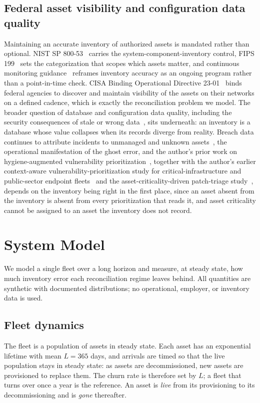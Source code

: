 \documentclass[journal]{IEEEtran}
\begin{document}
\subsection{Federal asset visibility and configuration data quality}
Maintaining an accurate inventory of authorized assets is mandated rather than optional. NIST SP
800-53~\cite{nist80053} carries the system-component-inventory control, FIPS 199~\cite{fips199} sets
the categorization that scopes which assets matter, and continuous monitoring
guidance~\cite{nist80137,nist80137a} reframes inventory accuracy as an ongoing program rather than a
point-in-time check. CISA Binding Operational Directive 23-01~\cite{cisabod2301} binds federal
agencies to discover and maintain visibility of the assets on their networks on a defined cadence,
which is exactly the reconciliation problem we model. The broader question of database and
configuration data quality, including the security consequences of stale or wrong
data~\cite{bertino2005database}, sits underneath: an inventory is a database whose value collapses
when its records diverge from reality. Breach data continues to attribute incidents to unmanaged and
unknown assets~\cite{verizon2026dbir}, the operational manifestation of the ghost error, and the
author's prior work on hygiene-augmented vulnerability
prioritization~\cite{paper4hygieneprio}, together with the author's earlier context-aware
vulnerability-prioritization study for critical-infrastructure and public-sector endpoint
fleets~\cite{paper11capg} and the asset-criticality-driven patch-triage
study~\cite{paper14patch}, depends on the inventory being
right in the first place, since an asset absent from the inventory is absent from every
prioritization that reads it, and asset criticality cannot be assigned to an asset the inventory
does not record.

\section{System Model}
We model a single fleet over a long horizon and measure, at steady state, how much inventory error
each reconciliation regime leaves behind. All quantities are synthetic with documented
distributions; no operational, employer, or inventory data is used.

\subsection{Fleet dynamics}
The fleet is a population of assets in steady state. Each asset has an exponential lifetime with mean
$L = 365$ days, and arrivals are timed so that the live population stays in steady state: as assets
are decommissioned, new assets are provisioned to replace them. The churn rate is therefore set by
$L$; a fleet that turns over once a year is the reference. An asset is \emph{live} from its
provisioning to its decommissioning and is \emph{gone} thereafter.
\end{document}
